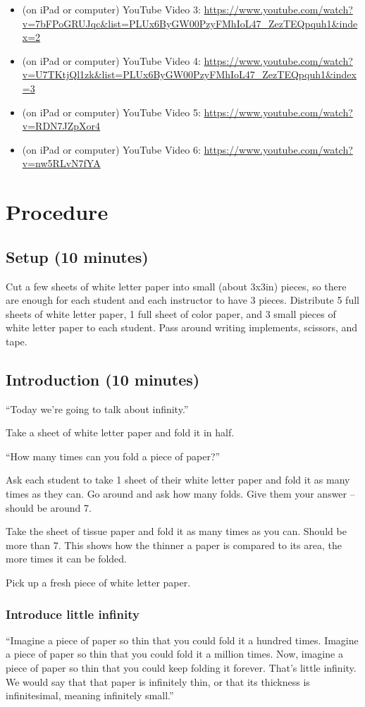 \documentclass{lessonplan}
\begin{document}
\begin{itemize}
        \item (on iPad or computer) YouTube Video 3: 
          \url{https://www.youtube.com/watch?v=7bFPoGRUJqc&list=PLUx6ByGW00PzyFMhIoL47_ZezTEQpquh1&index=2}
        \item (on iPad or computer) YouTube Video 4: 
          \url{https://www.youtube.com/watch?v=U7TKtjQl1zk&list=PLUx6ByGW00PzyFMhIoL47_ZezTEQpquh1&index=3}
        \item (on iPad or computer) YouTube Video 5: \url{https://www.youtube.com/watch?v=RDN7JZpXor4}
        \item (on iPad or computer) YouTube Video 6: \url{https://www.youtube.com/watch?v=nw5RLvN7fYA}
      \end{itemize}
  \section{Procedure}
    \subsection{Setup (10 minutes)}
      Cut a few sheets of white letter paper into small (about 3x3in) pieces, so there are enough for each student and 
      each instructor to have 3 pieces. Distribute 5 full sheets of white letter paper, 1 full sheet of color paper,  
      and 3 small pieces of white letter paper to each student. Pass around writing implements, scissors, and tape.
    \subsection{Introduction (10 minutes)}
      ``Today we're going to talk about infinity.''

      Take a sheet of white letter paper and fold it in half. 

      ``How many times can you fold a piece of paper?''

      Ask each student to take 1 sheet of their white letter paper and fold it as many times as they can.
      Go around and ask how many folds. Give them your answer -- should be around 7. 

      Take the sheet of tissue paper and fold it as many times as you can. Should be more than 7. This shows how the 
      thinner a paper is compared to its area, the more times it can be folded.

      Pick up a fresh piece of white letter paper.
      \subsubsection{Introduce little infinity}
        ``Imagine a piece of paper so thin that you could fold it a hundred times. Imagine a piece of paper so thin that 
        you could fold it a million times. Now, imagine a piece of paper so thin that you could keep folding it forever. 
        That's little infinity. We would say that that paper is infinitely thin, or that its thickness is infinitesimal, 
        meaning infinitely small.''
\end{document}
